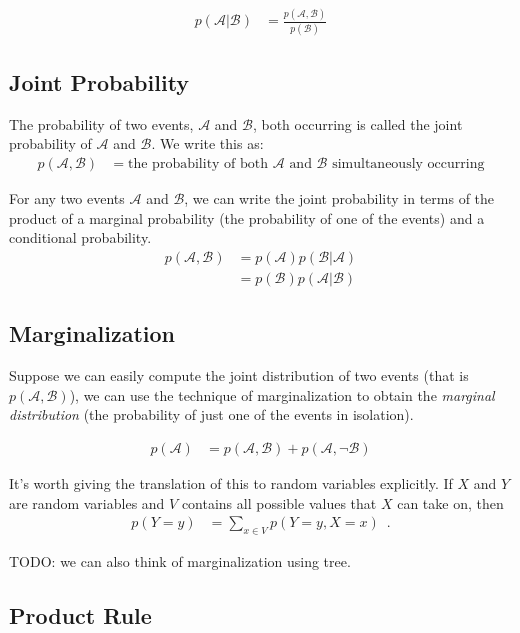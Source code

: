 \documentclass{tufte-handout}
\begin{document}
\begin{align}
p(\mathcal{A}|\mathcal{B}) &= \frac{p(\mathcal{A}, \mathcal{B})}{p(\mathcal{B})}
\end{align}

\subsection{Joint Probability}
The probability of two events, $\mathcal{A}$ and $\mathcal{B}$, both occurring is called the joint probability of $\mathcal{A}$ and $\mathcal{B}$.  We write this as:
\begin{align}
p(\mathcal{A}, \mathcal{B}) &= \mbox{the probability of both $\mathcal{A}$ and $\mathcal{B}$ simultaneously occurring}
\end{align}

For any two events $\mathcal{A}$ and $\mathcal{B}$, we can write the joint probability in terms of the product of a marginal probability (the probability of one of the events) and a conditional probability.
\begin{align}
p(\mathcal{A}, \mathcal{B}) &= p(\mathcal{A}) p( \mathcal{B} | \mathcal{A})  \\
&= p(\mathcal{B}) p( \mathcal{A} | \mathcal{B})
\end{align}


\subsection{Marginalization}
Suppose we can easily compute the joint distribution of two events (that is $p(\mathcal{A}, \mathcal{B})$), we can use the technique of marginalization to obtain the \emph{marginal distribution} (the probability of just one of the events in isolation).

\begin{align}
p(\mathcal{A}) &= p(\mathcal{A}, \mathcal{B}) + p(\mathcal{A}, \neg \mathcal{B})
\end{align}

It's worth giving the translation of this to random variables explicitly.  If $X$ and $Y$ are random variables and $V$ contains all possible values that $X$ can take on, then
\begin{align}
p(Y=y) &= \sum_{x \in V} p(Y=y, X=x) \enspace .
\end{align}

TODO: we can also think of marginalization using tree.

\subsection{Product Rule}
\end{document}
